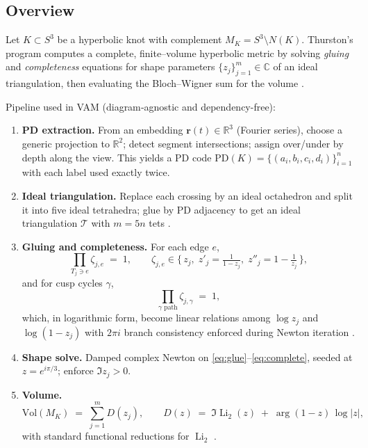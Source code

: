 \subsection{Overview}
    Let \(K\subset S^3\) be a hyperbolic knot with complement \(M_K = S^3\setminus N(K)\).
    Thurston’s program computes a complete, finite–volume hyperbolic metric by solving \emph{gluing} and \emph{completeness} equations for shape parameters \(\{z_j\}_{j=1}^m\in\mathbb{C}\) of an ideal triangulation, then evaluating the Bloch–Wigner sum for the volume \cite{ThurstonNotes,NeumannZagier1985,AdamsWeeks1992}.

    Pipeline used in VAM (diagram‐agnostic and dependency-free):

    \begin{enumerate}
        \item \textbf{PD extraction.} From an embedding \( \mathbf{r}(t)\in\mathbb{R}^3 \) (Fourier series), choose a generic projection to \(\mathbb{R}^2\); detect segment intersections; assign over/under by depth along the view. This yields a PD code \(\mathrm{PD}(K)=\{(a_i,b_i,c_i,d_i)\}_{i=1}^n\) with each label used exactly twice.
        \item \textbf{Ideal triangulation.} Replace each crossing by an ideal octahedron and split it into five ideal tetrahedra; glue by PD adjacency to get an ideal triangulation \(\mathcal{T}\) with \(m=5n\) tets \cite{ThurstonNotes,AdamsWeeks1992}.
        \item \textbf{Gluing and completeness.} For each edge \(e\),
        \begin{equation}
            \prod_{T_j\ni e} \zeta_{j,e} \;=\; 1,
            \qquad
            \zeta_{j,e}\in\{\,z_j,\; z'_j=\tfrac{1}{1-z_j},\; z''_j=1-\tfrac{1}{z_j}\,\},
            \label{eq:glue}
        \end{equation}
        and for cusp cycles \(\gamma\),
        \begin{equation}
            \prod_{\gamma\text{ path}} \zeta_{j,\gamma} \;=\; 1,
            \label{eq:complete}
        \end{equation}
        which, in logarithmic form, become linear relations among \(\log z_j\) and \(\log(1-z_j)\) with \(2\pi i\) branch consistency enforced during Newton iteration \cite{NeumannZagier1985}.
        \item \textbf{Shape solve.} Damped complex Newton on \eqref{eq:glue}–\eqref{eq:complete}, seeded at \(z=e^{i\pi/3}\); enforce \(\Im z_j>0\).
        \item \textbf{Volume.}
        \begin{equation}
            \mathrm{Vol}(M_K) \;=\; \sum_{j=1}^m D(z_j),
            \qquad
            D(z) \;=\; \Im\!\operatorname{Li}_2(z) \;+\; \arg(1-z)\,\log|z|,
            \label{eq:BW}
        \end{equation}
        with standard functional reductions for \(\operatorname{Li}_2\) \cite{Lewin1981,NeumannZagier1985}.
    \end{enumerate}

